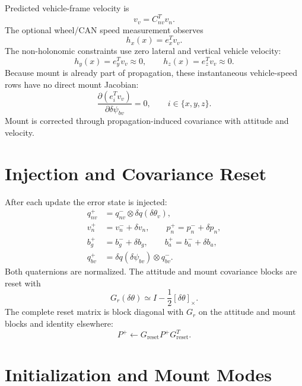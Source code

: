 \documentclass[11pt]{article}
\newcommand{\T}{^{T}}
\newcommand{\crossmat}[1]{\left[#1\right]_\times}
\newcommand{\dq}{\delta q}
\begin{document}
Predicted vehicle-frame velocity is
\begin{equation}
  v_v=C_{nv}\T v_n .
\end{equation}
The optional wheel/CAN speed measurement observes
\begin{equation}
  h_x(x)=e_x\T v_v .
\end{equation}
The non-holonomic constraints use zero lateral and vertical vehicle velocity:
\begin{equation}
  h_y(x)=e_y\T v_v\approx 0,\qquad
  h_z(x)=e_z\T v_v\approx 0 .
\end{equation}
Because mount is already part of propagation, these instantaneous vehicle-speed
rows have no direct mount Jacobian:
\begin{equation}
  \frac{\partial(e_i\T v_v)}{\partial\delta\psi_{bv}} = 0,\qquad i\in\{x,y,z\}.
\end{equation}
Mount is corrected through propagation-induced covariance with attitude and
velocity.

\section{Injection and Covariance Reset}

After each update the error state is injected:
\begin{align}
  q_{nv}^{+} &= q_{nv}^{-}\otimes\dq(\delta\theta_v),\\
  v_n^{+} &= v_n^{-}+\delta v_n,\qquad
  p_n^{+}=p_n^{-}+\delta p_n,\\
  b_g^{+} &= b_g^{-}+\delta b_g,\qquad
  b_a^{+}=b_a^{-}+\delta b_a,\\
  q_{bv}^{+} &= \dq(\delta\psi_{bv})\otimes q_{bv}^{-}.
\end{align}
Both quaternions are normalized. The attitude and mount covariance
blocks are reset with
\begin{equation}
  G_r(\delta\theta)\simeq I-\frac{1}{2}\crossmat{\delta\theta}.
\end{equation}
The complete reset matrix is block diagonal with \(G_r\) on the attitude and mount
blocks and identity elsewhere:
\begin{equation}
  P^{+}\leftarrow G_{\mathrm{reset}}P^{+}G_{\mathrm{reset}}\T .
\end{equation}

\section{Initialization and Mount Modes}
\end{document}
